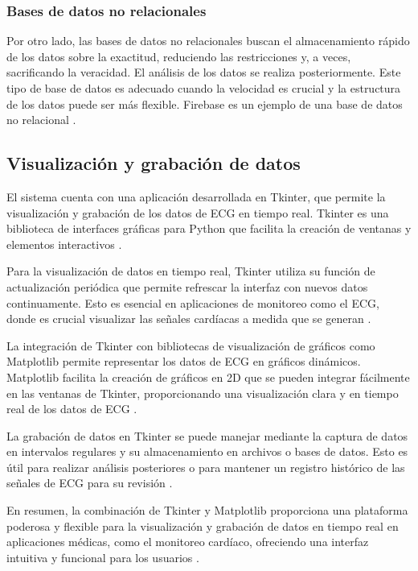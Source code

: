 \subsubsection{Bases de datos no relacionales}

Por otro lado, las bases de datos no relacionales buscan el almacenamiento rápido de los datos sobre la exactitud, reduciendo las restricciones y, a veces, sacrificando la veracidad. El análisis de los datos se realiza posteriormente. Este tipo de base de datos es adecuado cuando la velocidad es crucial y la estructura de los datos puede ser más flexible. Firebase es un ejemplo de una base de datos no relacional \cite{Structuralia}.

\subsection{Visualización y grabación de datos}

El sistema cuenta con una aplicación desarrollada en Tkinter, que permite la visualización y grabación de los datos de ECG en tiempo real. Tkinter es una biblioteca de interfaces gráficas para Python que facilita la creación de ventanas y elementos interactivos \cite{tkinter_docs}.

Para la visualización de datos en tiempo real, Tkinter utiliza su función de actualización periódica que permite refrescar la interfaz con nuevos datos continuamente. Esto es esencial en aplicaciones de monitoreo como el ECG, donde es crucial visualizar las señales cardíacas a medida que se generan \cite{tkinter_real_time}.

La integración de Tkinter con bibliotecas de visualización de gráficos como Matplotlib permite representar los datos de ECG en gráficos dinámicos. Matplotlib facilita la creación de gráficos en 2D que se pueden integrar fácilmente en las ventanas de Tkinter, proporcionando una visualización clara y en tiempo real de los datos de ECG \cite{matplotlib}.

La grabación de datos en Tkinter se puede manejar mediante la captura de datos en intervalos regulares y su almacenamiento en archivos o bases de datos. Esto es útil para realizar análisis posteriores o para mantener un registro histórico de las señales de ECG para su revisión \cite{tkinter_data_logging}.

En resumen, la combinación de Tkinter y Matplotlib proporciona una plataforma poderosa y flexible para la visualización y grabación de datos en tiempo real en aplicaciones médicas, como el monitoreo cardíaco, ofreciendo una interfaz intuitiva y funcional para los usuarios \cite{tkinter_matplotlib_integration}.


